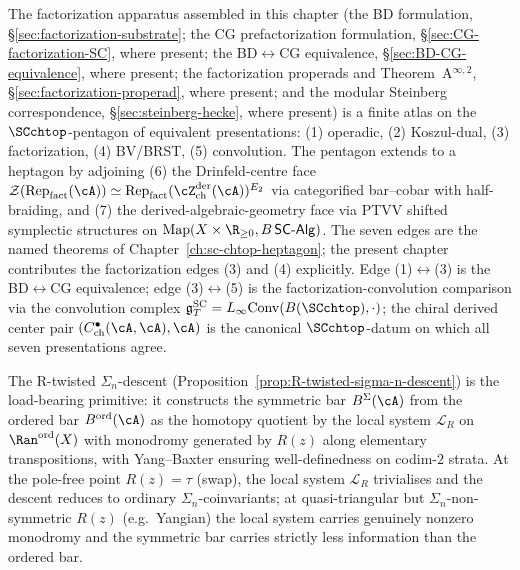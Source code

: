 \begin{remark}
\label{rem:factorization-pentagon-heptagon-anchor}%
%
The factorization apparatus assembled in this chapter (the BD
formulation, \S\ref{sec:factorization-substrate}; the CG
prefactorization formulation, \S\ref{sec:CG-factorization-SC},
where present; the BD$\leftrightarrow$CG equivalence,
\S\ref{sec:BD-CG-equivalence}, where present; the factorization
properads and Theorem~A${}^{\infty,2}$,
\S\ref{sec:factorization-properad}, where
present; and the modular Steinberg correspondence,
\S\ref{sec:steinberg-hecke}, where present) is
a finite atlas on the $\SCchtop$-pentagon of equivalent
presentations: (1) operadic, (2) Koszul-dual, (3) factorization,
(4) BV/BRST, (5) convolution. The pentagon extends to a heptagon
by adjoining (6) the Drinfeld-centre face
$\mathcal{Z}(\mathrm{Rep}_{\mathrm{fact}}(\cA)) \simeq
\mathrm{Rep}_{\mathrm{fact}}(\cZ^{\mathrm{der}}_{\mathrm{ch}}(\cA))^{E_2}$
via categorified bar--cobar with half-braiding, and (7) the
derived-algebraic-geometry face via PTVV shifted symplectic
structures on
$\mathrm{Map}(X \times \R_{\geq 0}, B\,\mathsf{SC}\text{-}\mathsf{Alg})$.
The seven edges are the named theorems of
Chapter~\ref{ch:sc-chtop-heptagon}; the present chapter contributes
the factorization edges (3) and (4) explicitly. Edge
(1)$\leftrightarrow$(3) is the BD$\leftrightarrow$CG equivalence;
edge (3)$\leftrightarrow$(5) is the factorization-convolution
comparison via the convolution complex
$\mathfrak{g}^{\mathrm{SC}}_T = L_\infty\mathrm{Conv}(B(\SCchtop), \cdot)$;
the chiral derived center pair
$(C^\bullet_{\mathrm{ch}}(\cA, \cA), \cA)$ is the canonical
$\SCchtop$-datum on which all seven presentations agree.

The R-twisted $\Sigma_n$-descent
(Proposition~\ref{prop:R-twisted-sigma-n-descent}) is the
load-bearing primitive: it constructs the symmetric bar
$B^\Sigma(\cA)$ from the ordered bar $B^{\mathrm{ord}}(\cA)$ as
the homotopy quotient by the local system
$\mathcal{L}_R$ on $\Ran^{\mathrm{ord}}(X)$ with monodromy
generated by $R(z)$ along elementary transpositions, with
Yang--Baxter ensuring well-definedness on codim-$2$ strata. At
the pole-free point $R(z) = \tau$ (swap), the local system
$\mathcal{L}_R$ trivialises and the descent reduces to ordinary
$\Sigma_n$-coinvariants; at quasi-triangular but $\Sigma_n$-non-symmetric
$R(z)$ (e.g.\ Yangian) the local system carries genuinely
nonzero monodromy and the symmetric bar carries strictly less
information than the ordered bar.
\end{remark}


